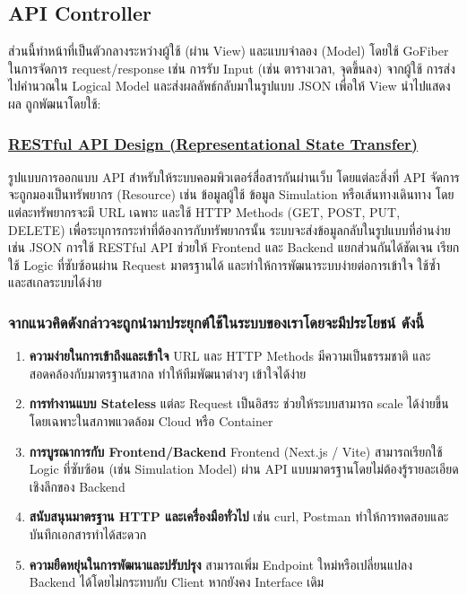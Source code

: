 \subsection{API Controller}
  ส่วนนี้ทำหน้าที่เป็นตัวกลางระหว่างผู้ใช้ (ผ่าน View) และแบบจำลอง (Model) 
  โดยใช้ GoFiber ในการจัดการ request/response
  เช่น การรับ Input (เช่น ตารางเวลา, จุดขึ้นลง) จากผู้ใช้ 
  การส่งไปคำนวณใน Logical Model และส่งผลลัพธ์กลับมาในรูปแบบ JSON
  เพื่อให้ View นำไปแสดงผล ถูกพัฒนาโดยใช้:

\subsubsection{\textbf{\underline{RESTful API Design (Representational State Transfer)}}}
\begin{mypara}
    \indent รูปแบบการออกแบบ API สำหรับให้ระบบคอมพิวเตอร์สื่อสารกันผ่านเว็บ 
    โดยแต่ละสิ่งที่ API จัดการจะถูกมองเป็นทรัพยากร (Resource) 
    เช่น ข้อมูลผู้ใช้ ข้อมูล Simulation หรือเส้นทางเดินทาง โดยแต่ละทรัพยากรจะมี URL เฉพาะ 
    และใช้ HTTP Methods (GET, POST, PUT, DELETE) เพื่อระบุการกระทำที่ต้องการกับทรัพยากรนั้น 
    ระบบจะส่งข้อมูลกลับในรูปแบบที่อ่านง่าย เช่น JSON การใช้ RESTful API ช่วยให้ Frontend 
    และ Backend แยกส่วนกันได้ชัดเจน เรียกใช้ Logic ที่ซับซ้อนผ่าน Request มาตรฐานได้ 
    และทำให้การพัฒนาระบบง่ายต่อการเข้าใจ ใช้ซ้ำ และสเกลระบบได้ง่าย
\end{mypara}

\subsubsection{\textbf{จากแนวคิดดังกล่าวจะถูกนํามาประยุกต์ใช้ในระบบของเราโดยจะมีประโยชน์ ดังนี้}}
\begin{enumerate}
    \item \textbf{ความง่ายในการเข้าถึงและเข้าใจ}  
    URL และ HTTP Methods มีความเป็นธรรมชาติ และสอดคล้องกับมาตรฐานสากล ทำให้ทีมพัฒนาต่างๆ เข้าใจได้ง่าย
    \item \textbf{การทำงานแบบ Stateless}  
    แต่ละ Request เป็นอิสระ ช่วยให้ระบบสามารถ scale ได้ง่ายขึ้น โดยเฉพาะในสภาพแวดล้อม Cloud หรือ Container
    \item \textbf{การบูรณาการกับ Frontend/Backend}  
    Frontend (Next.js / Vite) สามารถเรียกใช้ Logic ที่ซับซ้อน (เช่น Simulation Model) ผ่าน API แบบมาตรฐานโดยไม่ต้องรู้รายละเอียดเชิงลึกของ Backend
    \item \textbf{สนับสนุนมาตรฐาน HTTP และเครื่องมือทั่วไป}  
    เช่น curl, Postman ทำให้การทดสอบและบันทึกเอกสารทำได้สะดวก
    \item \textbf{ความยืดหยุ่นในการพัฒนาและปรับปรุง}  
    สามารถเพิ่ม Endpoint ใหม่หรือเปลี่ยนแปลง Backend ได้โดยไม่กระทบกับ Client หากยังคง Interface เดิม
\end{enumerate}

